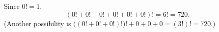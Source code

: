 Since $0!=1$,
\[\boxed{(0!+0!+0!+0!+0!+0!)!=6!=720}.\]
(Another possibility is $\bigl((0!+0!+0!)!\bigr)!+0+0+0=(3!)!=720$.)
